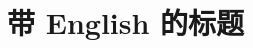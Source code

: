 

\chapter{带 English 的标题}
\label{cha:intro}



\cite{haloop, incoop, naiad, pacman, priter, rdd, restore, sangam, autoopt, bigtable, pig, flumejava, hive, piglatin, nemo, dsm}
